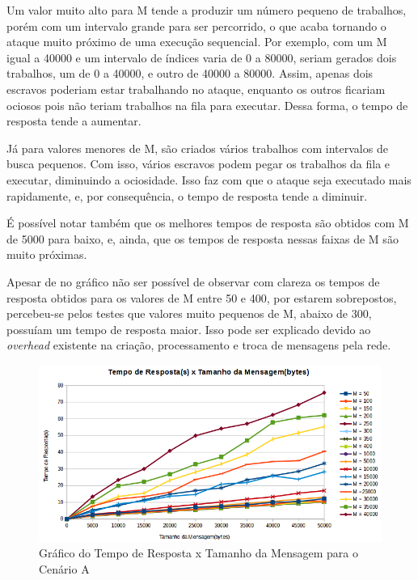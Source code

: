 \documentclass[
	12pt,				%
    oneside,			%
	a4paper,			%
	english,			%
	brazil,				%
	]{abntex2}
\begin{document}
Um valor muito alto para M tende a produzir um número pequeno de trabalhos, porém com um intervalo grande para ser percorrido, o que acaba tornando o ataque muito próximo de uma execução sequencial. Por exemplo, com um M igual a 40000 e um intervalo de índices varia de 0 a 80000, seriam gerados dois trabalhos, um de 0 a 40000, e outro de 40000 a 80000. Assim, apenas dois escravos poderiam estar trabalhando no ataque, enquanto os outros ficariam ociosos pois não teriam trabalhos na fila para executar. Dessa forma, o tempo de resposta tende a aumentar.

Já para valores menores de M, são criados vários trabalhos com intervalos de busca pequenos. Com isso, vários escravos podem pegar os trabalhos da fila e executar, diminuindo a ociosidade. Isso faz com que o ataque seja executado mais rapidamente, e, por consequência, o tempo de resposta tende a diminuir.

É possível notar também que os melhores tempos de resposta são obtidos com M de 5000 para baixo, e, ainda, que os tempos de resposta nessas faixas de M são muito próximas. 

Apesar de no gráfico não ser possível de observar com clareza os tempos de resposta obtidos para os valores de M entre 50 e 400, por estarem sobrepostos, percebeu-se pelos testes que valores muito pequenos de M, abaixo de 300, possuíam um tempo de resposta maior. Isso pode ser explicado devido ao \textit{overhead} existente na criação, processamento e troca de mensagens pela rede.

\begin{figure}[!htb]
\centering
\includegraphics[scale=0.7]{figuras/A.png}
\caption{Gráfico do Tempo de Resposta x Tamanho da Mensagem para o Cenário A}
\label{fig:tempo_respostaXtamanho_msg_A}
\end{figure}

\end{document}

